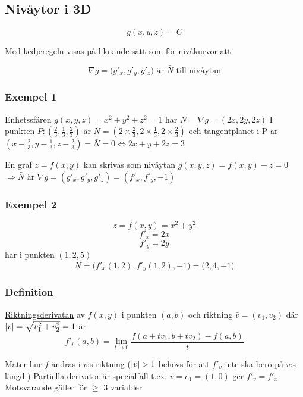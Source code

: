 \documentclass{article}
\DeclarePairedDelimiter \abs{\lvert}{\rvert}
\let\oldsqrt\sqrt
\renewcommand*{\sqrt}[2][\ ]{\oldsqrt[#1]{#2} }
\begin{document}
\subsection{Nivåytor i 3D}

\[g(x,y,z) = C\]

Med kedjeregeln visas på liknande sätt som för nivåkurvor att

\begin{framed}
\[
	\nabla g = \Big(g'_x,g'_y,g'_z\Big) \text{ är } \bar{N} \text{ till nivåytan}
\]
\end{framed}

\subsubsection{Exempel 1}

Enhetssfären \(g(x,y,z) = x^2 + y^2 + z^2 = 1\) har \(\bar{N} = \nabla g = (2x,2y,2z)\) \newline
I punkten \(P:\left(\frac{2}{3},\frac{1}{3},\frac{2}{3}\right)\) är 
\(\bar{N} = \left(2\times\frac{2}{3},2\times\frac{1}{3},2\times\frac{2}{3}\right)\) och tangentplanet i P är \newline
\(\left(x-\frac{2}{3},y-\frac{1}{3},z-\frac{2}{3}\right) = \bar{N} = 0 \iff 2x+y+2z = 3\) \newline

En graf \(z = f(x,y)\) kan skrivas som nivåytan \(g(x,y,z) = f(x,y) - z = 0\) \newline
\(\Rightarrow \bar{N}\) är \(\nabla g = (g'_x,g'_y,g'_z) = (f'_x,f'_y,-1) \)

\subsubsection{Exempel 2}

\[z = f(x,y) = x^2 + y^2\]
\[f'_x = 2x\]
\[f'_y = 2y\]
har i punkten \((1,2,5)\)
\[\bar{N} = \Big(f'_x(1,2),f'_y(1,2),-1\Big) = \Big(2,4,-1\Big)\]

\subsubsection{Definition}
\underline{Riktningsderivatan} av \(f(x,y)\) i punkten \((a,b)\) och riktning \(\bar{v} = (v_1,v_2)\) där 
\(\abs{\bar{v}} = \sqrt{v^2_1+v^2_2} = 1\) är 
\[f'_{\bar{v}}(a,b) = \lim_{t \rightarrow 0}\frac{f(a+tv_1,b+tv_2)-f(a,b)}{t}\]

Mäter hur \(f\) ändras i \(\bar{v}\):s riktning \newline
\Big(\(\abs{\bar{v}} > 1\) behövs för att \(f'_{\bar{v}}\) inte ska bero på \(\bar{v}\):s längd \Big)
Partiella derivator är specialfall t.ex. \(\bar{v} = \bar{e_1} = (1,0)\) ger \(f'_{\bar{v}} = f'_x\)
Motsvarande gäller för \(\geq\) 3 variabler
\end{document}
